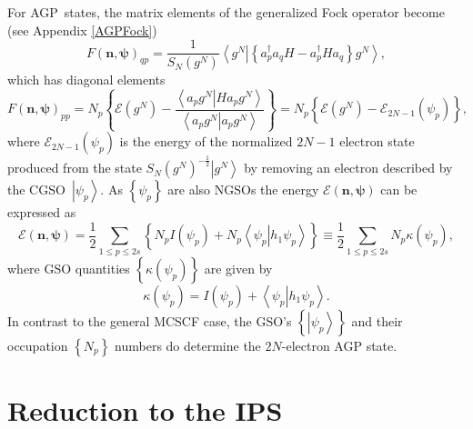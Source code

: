 \documentclass[aps,preprint]{revtex4}%
\begin{document}
For AGP\ states, the matrix elements of the generalized Fock operator become
(see Appendix \ref{AGPFock})
\begin{equation}
F\left(  \mathbf{n},\mathbf{\psi}\right)  _{qp}=\frac{1}{S_{N}\left(
g^{N}\right)  }\left\langle \left.  g^{N}\right\vert \left\{  a_{p}^{\dagger
}a_{q}H-a_{p}^{\dagger}Ha_{q}\right\}  g^{N}\right\rangle ,
\end{equation}
which has diagonal elements
\begin{equation}
F\left(  \mathbf{n},\mathbf{\psi}\right)  _{pp}=N_{p}\left\{  \mathcal{E}%
\left(  g^{N}\right)  -\frac{\left\langle \left.  a_{p}g^{N}\right\vert
Ha_{p}g^{N}\right\rangle }{\left\langle \left.  a_{p}g^{N}\right\vert
a_{p}g^{N}\right\rangle }\right\}  =N_{p}\left\{  \mathcal{E}\left(
g^{N}\right)  -\mathcal{E}_{2N-1}\left(  \psi_{p}\right)  \right\}  ,
\end{equation}
where $\mathcal{E}_{2N-1}\left(  \psi_{p}\right)  $ is the energy of the
normalized $2N-1$ electron state produced from the state $S_{N}\left(
g^{N}\right)  ^{-\frac{1}{2}}\left\vert g^{N}\right\rangle $ by removing an
electron described by the CGSO\ $\left\vert \psi_{p}\right\rangle $. As
$\left\{  \psi_{p}\right\}  $ are also NGSOs the energy $\mathcal{E}\left(
\mathbf{n},\mathbf{\psi}\right)  $ can be expressed as
\begin{equation}
\mathcal{E}\left(  \mathbf{n},\mathbf{\psi}\right)  =\frac{1}{2}\sum_{1\leq
p\leq2s}\left\{  N_{p}I\left(  \psi_{p}\right)  +N_{p}\left\langle \left.
\psi_{p}\right\vert h_{1}\psi_{p}\right\rangle \right\}  \equiv\frac{1}{2}%
{\textstyle\sum\limits_{1\leq p\leq2s}}
N_{p}\kappa\left(  \psi_{p}\right)  ,
\end{equation}
where GSO quantities $\left\{  \kappa\left(  \psi_{p}\right)  \right\}  $ are
given by
\begin{equation}
\kappa\left(  \psi_{p}\right)  =I\left(  \psi_{p}\right)  +\left\langle
\left.  \psi_{p}\right\vert h_{1}\psi_{p}\right\rangle .
\end{equation}
In contrast to the general MCSCF case, the GSO's $\left\{  \left\vert \psi
_{p}\right\rangle \right\}  $ and their occupation $\left\{  N_{p}\right\}  $
numbers do determine the $2N$-electron AGP state.

\section{Reduction to the IPS \label{IPS}}
\end{document}
